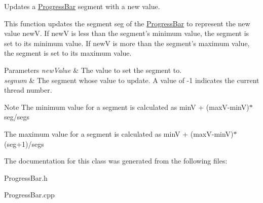 \-Updates a \hyperlink{classtsgl_1_1_progress_bar}{\-Progress\-Bar} segment with a new value. 

\-This function updates the segment {\ttfamily seg} of the \hyperlink{classtsgl_1_1_progress_bar}{\-Progress\-Bar} to represent the new value {\ttfamily new\-V}. \-If new\-V is less than the segment's minimum value, the segment is set to its minimum value. \-If new\-V is more than the segment's maximum value, the segment is set to its maximum value. 
\begin{DoxyParams}{\-Parameters}
{\em new\-Value} & \-The value to set the segment to. \\
\hline
{\em segnum} & \-The segment whose value to update. \-A value of -\/1 indicates the current thread number. \\
\hline
\end{DoxyParams}
\begin{DoxyNote}{\-Note}
\-The minimum value for a segment is calculated as {\ttfamily min\-V + (max\-V-\/min\-V)$\ast$seg/segs} 

\-The maximum value for a segment is calculated as {\ttfamily min\-V + (max\-V-\/min\-V)$\ast$(seg+1)/segs} 
\end{DoxyNote}


\-The documentation for this class was generated from the following files\-:\begin{DoxyCompactItemize}
\item 
\-Progress\-Bar.\-h\item 
\-Progress\-Bar.\-cpp\end{DoxyCompactItemize}
